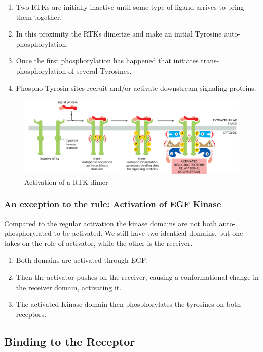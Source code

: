 \documentclass[../main.tex]{subfiles}
\begin{document}
\begin{enumerate}
	\item Two RTKs are initially inactive until some type of ligand arrives to bring them together.
	\item In this proximity the RTKs dimerize and make an initial Tyrosine auto-phosphorylation.
	\item Once the first phosphorylation has happened that initiates trans-phosphorylation of several Tyrosines.
	\item Phospho-Tyrosin sites recruit and/or activate downstream signaling proteins.
\end{enumerate}
\begin{figure}[H]
	\centering
	\includegraphics[height=0.3\textwidth]{RTk_act}
	\caption{Activation of a RTK dimer}
\end{figure}

\subsubsection{An exception to the rule: Activation of EGF Kinase}

Compared to the regular activation the kinase domains are not both auto-phosphorylated to be activated. We still have two identical domains, but one takes on the role of activator, while the other is the receiver.

\begin{enumerate}
	\item Both domains are activated through EGF.
	\item Then the activator pushes on the receiver, causing a conformational change in the receiver domain, activating it. 
	\item The activated Kinase domain then phosphorylates the tyrosines on both receptors.
\end{enumerate}

\subsection{Binding to the Receptor}
\end{document}

